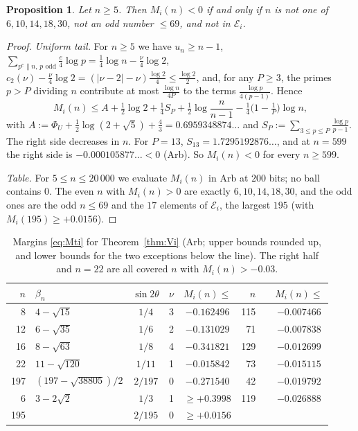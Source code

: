 \documentclass[11pt]{amsart}
\newtheorem{proposition}[theorem]{Proposition}
\theoremstyle{definition}
\theoremstyle{remark}
\numberwithin{equation}{section}
\newcommand{\cE}{\mathcal{E}}
\begin{document}
\begin{proposition}\label{prop:marginsti}
Let $n\ge5$. Then $M_i(n)<0$ if and only if $n$ is not one of $6,10,14,18,30$, not an odd number $\le69$, and not in
$\cE_i$.
\end{proposition}

\begin{proof}
\emph{Uniform tail.} For $n\ge5$ we have $u_n\ge n-1$, $\sum_{p^e\parallel n,\,p\text{ odd}}\frac e4\log p=\frac14\log
n-\frac\nu4\log2$, $c_2(\nu)-\frac\nu4\log2=(|\nu-2|-\nu)\frac{\log2}4\le\frac{\log2}2$, and, for any $P\ge3$, the primes
$p>P$ dividing $n$ contribute at most $\frac{\log n}{4P}$ to the terms $\frac{\log p}{4(p-1)}$. Hence
\[
  M_i(n)\le A+\tfrac12\log2+\tfrac14S_P+\tfrac12\log\frac n{n-1}-\tfrac14\bigl(1-\tfrac1P\bigr)\log n,
\]
with $A:=\Phi_U+\frac12\log(2+\sqrt5)+\frac43=0.6959348874\ldots$ and $S_P:=\sum_{3\le p\le P}\frac{\log p}{p-1}$. The right
side decreases in $n$. For $P=13$, $S_{13}=1.7295192876\ldots$, and at $n=599$ the right side is
$-0.000105877\ldots<0$ (Arb). So $M_i(n)<0$ for every $n\ge599$.

\emph{Table.} For $5\le n\le20\,000$ we evaluate $M_i(n)$ in Arb at $200$ bits; no ball contains $0$. The even $n$ with
$M_i(n)>0$ are exactly $6,10,14,18,30$, and the odd ones are the odd $n\le69$ and the $17$ elements of $\cE_i$, the largest
$195$ (with $M_i(195)\ge+0.0156$).
\end{proof}

\begin{table}[ht]
\centering\small
\begin{tabular}{@{}rlccc|rlc@{}}
\toprule
$n$ & $\beta_n$ & $\sin2\theta$ & $\nu$ & $M_i(n)\le$ & $n$ & & $M_i(n)\le$\\
\midrule
8 & $4-\sqrt{15}$ & $1/4$ & 3 & $-0.162496$ & 115 & & $-0.007466$\\
12 & $6-\sqrt{35}$ & $1/6$ & 2 & $-0.131029$ & 71 & & $-0.007838$\\
16 & $8-\sqrt{63}$ & $1/8$ & 4 & $-0.341821$ & 129 & & $-0.012699$\\
22 & $11-\sqrt{120}$ & $1/11$ & 1 & $-0.015842$ & 73 & & $-0.015115$\\
197 & $(197-\sqrt{38805})/2$ & $2/197$ & 0 & $-0.271540$ & 42 & & $-0.019792$\\
\midrule
6 & $3-2\sqrt2$ & $1/3$ & 1 & $\ge+0.3998$ & 119 & & $-0.026888$\\
195 & & $2/195$ & 0 & $\ge+0.0156$ & & & \\
\bottomrule
\end{tabular}
\caption{Margins \eqref{eq:Mti} for Theorem~\ref{thm:Vi} (Arb; upper bounds rounded up, and lower bounds for the two
exceptions below the line). The right half and $n=22$ are all covered $n$ with $M_i(n)>-0.03$.}\label{tab:marginsti}
\end{table}
\end{document}
